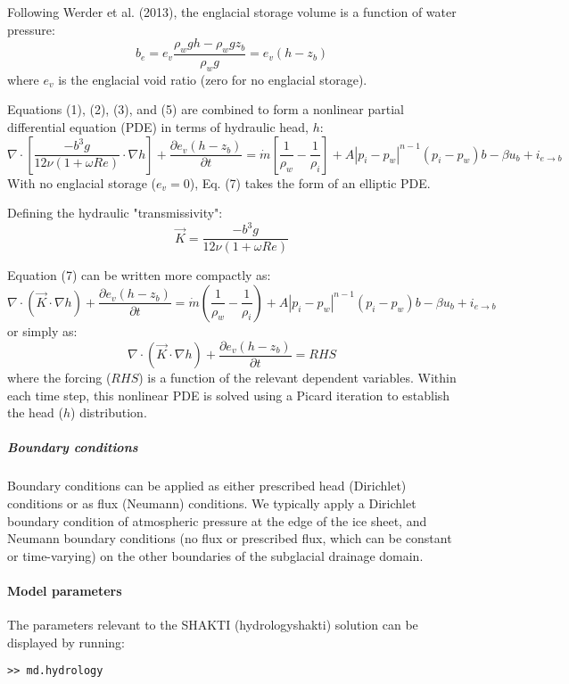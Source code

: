 Following Werder et al. (2013), the englacial storage volume is a function of water pressure:
\begin{equation}
	b_e=e_v\frac{\rho_wgh-\rho_wgz_b}{\rho_wg}=e_v(h-z_b)
\end{equation}
where $e_v$ is the englacial void ratio (zero for no englacial storage).

Equations (1), (2), (3), and (5) are combined to form a nonlinear partial differential equation (PDE) in terms of hydraulic head, $h$:
\begin{equation}
	\nabla\cdot\left[\frac{-b^3g}{12\nu(1+\omega Re)}\cdot\nabla h\right]+\frac{\partial e_v(h-z_b)}{\partial t}=\dot{m}\left[\frac{1}{\rho_w}-\frac{1}{\rho_i}\right]+A|p_i-p_w|^{n-1}(p_i-p_w)b-\beta u_b+i_{e\rightarrow b}
\end{equation}
With no englacial storage ($e_v=0$), Eq. (7) takes the form of an elliptic PDE.

Defining the hydraulic "transmissivity":
\begin{equation}
	\vec{K}=\frac{-b^3g}{12\nu(1+\omega Re)}
\end{equation}

Equation (7) can be written more compactly as:
\begin{equation}
	\nabla\cdot(\vec{K}\cdot\nabla h)+\frac{\partial e_v(h-z_b)}{\partial t}=\dot{m}(\frac{1}{\rho_w}-\frac{1}{\rho_i})+A|p_i-p_w|^{n-1}(p_i-p_w)b-\beta u_b+i_{e\rightarrow b}
\end{equation}
or simply as:
\begin{equation}
	\nabla\cdot(\vec{K}\cdot\nabla h)+\frac{\partial e_v(h-z_b)}{\partial t}=RHS
\end{equation}
where the forcing ($RHS$) is a function of the relevant dependent variables. Within each time step, this nonlinear PDE is solved using a Picard iteration to establish the head ($h$) distribution.

\subparagraph{Boundary conditions}
Boundary conditions can be applied as either prescribed head (Dirichlet) conditions or as flux (Neumann) conditions. We typically apply a Dirichlet boundary condition of atmospheric pressure at the edge of the ice sheet, and Neumann boundary conditions (no flux or prescribed flux, which can be constant or time-varying) on the other boundaries of the subglacial drainage domain.

\paragraph{Model parameters}
The parameters relevant to the SHAKTI (hydrologyshakti) solution can be displayed by running:
\begin{lstlisting}
>> md.hydrology
\end{lstlisting}


